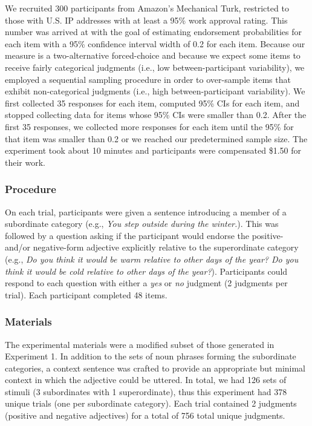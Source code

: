 \documentclass[doc]{apa6}
\begin{document}
We recruited 300 participants from Amazon's Mechanical Turk, restricted to those with U.S. IP addresses with at least a 95\% work approval rating.
This number was arrived at with the goal of estimating endorsement probabilities for each item with a 95\% confidence interval width of 0.2 for each item.
Because our measure is a two-alternative forced-choice and because we expect some items to receive fairly categorical judgments (i.e., low between-participant variability), we employed a sequential sampling procedure in order to over-sample items that exhibit non-categorical judgments (i.e., high between-participant variability).
We first collected 35 responses for each item, computed 95\% CIs for each item, and stopped collecting data for items whose 95\% CIs were smaller than 0.2.
After the first 35 responses, we collected more responses for each item until the 95\% for that item was smaller than 0.2 or we reached our predetermined sample size.
The experiment took about 10 minutes and participants were compensated \$1.50 for their work.

\subsubsection{Procedure}

On each trial, participants were given a sentence introducing a member of a subordinate category (e.g., \emph{You step outside during the winter.}).
This was followed by a question asking if the participant would endorse the positive- and/or negative-form adjective explicitly relative to the superordinate category (e.g., \emph{Do you think it would be warm relative to other days of the year? Do you think it would be cold relative to other days of the year?}).
Participants could respond to each question with either a \emph{yes} or \emph{no} judgment (2 judgments per trial).
Each participant completed 48 items.

\subsubsection{Materials}

The experimental materials were a modified subset of those generated in Experiment 1.
In addition to the sets of noun phrases forming the subordinate categories, a context sentence was crafted to provide an appropriate but minimal context in which the adjective could be uttered.
In total, we had 126 sets of stimuli (3 subordinates with 1 superordinate), thus this experiment had 378 unique trials (one per subordinate category).
Each trial contained 2 judgments (positive and negative adjectives) for a total of 756 total unique judgments.
\end{document}
